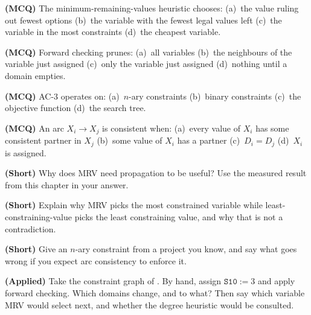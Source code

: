 \begin{reviewq}
  \item \textbf{(MCQ)} The minimum-remaining-values heuristic chooses:
        (a)~the value ruling out fewest options (b)~the variable with the fewest
        legal values left (c)~the variable in the most constraints (d)~the
        cheapest variable.
  \item \textbf{(MCQ)} Forward checking prunes: (a)~all variables
        (b)~the neighbours of the variable just assigned (c)~only the variable
        just assigned (d)~nothing until a domain empties.
  \item \textbf{(MCQ)} AC-3 operates on: (a)~$n$-ary constraints (b)~binary
        constraints (c)~the objective function (d)~the search tree.
  \item \textbf{(MCQ)} An arc $X_{i} \to X_{j}$ is consistent when:
        (a)~every value of $X_{i}$ has some consistent partner in $X_{j}$
        (b)~some value of $X_{i}$ has a partner (c)~$D_{i} = D_{j}$
        (d)~$X_{i}$ is assigned.
  \item \textbf{(Short)} Why does MRV need propagation to be useful? Use the
        measured result from this chapter in your answer.
  \item \textbf{(Short)} Explain why MRV picks the most constrained variable while
        least-constraining-value picks the least constraining value, and why that
        is not a contradiction.
  \item \textbf{(Short)} Give an $n$-ary constraint from a project you know, and
        say what goes wrong if you expect arc consistency to enforce it.
  \item \textbf{(Applied)} Take the constraint graph of . By hand,
        assign $\texttt{S10} := 3$ and apply forward checking. Which domains
        change, and to what? Then say which variable MRV would select next, and
        whether the degree heuristic would be consulted.
\end{reviewq}
